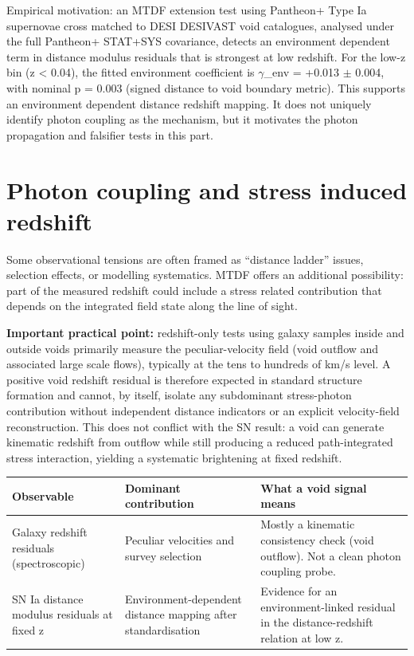 \documentclass[11pt,a4paper]{article}
\begin{document}
Empirical motivation: an MTDF extension test using Pantheon+ Type Ia supernovae cross matched to DESI DESIVAST void catalogues, analysed under the full Pantheon+ STAT+SYS covariance, detects an environment dependent term in distance modulus residuals that is strongest at low redshift. For the low-z bin (z < 0.04), the fitted environment coefficient is $\gamma$\_\allowbreak{}env = +0.013 $\pm$ 0.004, with nominal p = 0.003 (signed distance to void boundary metric). This supports an environment dependent distance redshift mapping. It does not uniquely identify photon coupling as the mechanism, but it motivates the photon propagation and falsifier tests in this part.

\section{Photon coupling and stress induced redshift}
\label{sec:photon}
Some observational tensions are often framed as ``distance ladder'' issues, selection effects, or modelling systematics.
MTDF offers an additional possibility: part of the measured redshift could include a stress related contribution that depends on the integrated field state along the line of sight.

\textbf{Important practical point:} redshift-only tests using galaxy samples inside and outside voids primarily measure the peculiar-velocity field (void outflow and associated large scale flows), typically at the tens to hundreds of km/\allowbreak{}s level. A positive void redshift residual is therefore expected in standard structure formation and cannot, by itself, isolate any subdominant stress-photon contribution without independent distance indicators or an explicit velocity-field reconstruction. This does not conflict with the SN result: a void can generate kinematic redshift from outflow while still producing a reduced path-integrated stress interaction, yielding a systematic brightening at fixed redshift.

\begin{table}[H]
\centering
\footnotesize
\begin{tabularx}{\linewidth}{l>{\RaggedRight\arraybackslash}X>{\RaggedRight\arraybackslash}X}
\toprule
\textbf{Observable} & \textbf{Dominant contribution} & \textbf{What a void signal means} \tabularnewline
\midrule
Galaxy redshift residuals (spectroscopic) & Peculiar velocities and survey selection & Mostly a kinematic consistency check (void outflow). Not a clean photon coupling probe. \tabularnewline
SN Ia distance modulus residuals at fixed z & Environment-dependent distance mapping after standardisation & Evidence for an environment-linked residual in the distance-redshift relation at low z. \tabularnewline
\bottomrule
\end{tabularx}
\end{table}
\end{document}
